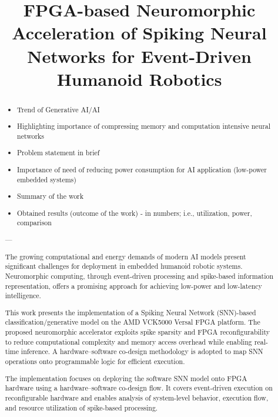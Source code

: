 \documentclass[conference]{IEEEtran}
\begin{document}
\title{%
FPGA-based Neuromorphic Acceleration of Spiking Neural Networks for Event-Driven Humanoid Robotics}
\author{

}

\maketitle

\begin{abstract}

\begin{itemize}
\item Trend of Generative AI/AI
\item Highlighting importance of compressing memory and computation intensive neural networks
\item Problem statement in brief
\item Importance of need of reducing power consumption for AI application (low-power embedded systems)
\item Summary of the work
\item Obtained results (outcome of the work) - in numbers; i.e., utilization, power, comparison
\end{itemize}

---

The growing computational and energy demands of modern AI models present significant challenges for deployment in embedded humanoid robotic systems. Neuromorphic computing, through event-driven processing and spike-based information representation, offers a promising approach for achieving low-power and low-latency intelligence.

This work presents the implementation of a Spiking Neural Network (SNN)-based classification/generative model on the AMD VCK5000 Versal FPGA platform. The proposed neuromorphic accelerator exploits spike sparsity and FPGA reconfigurability to reduce computational complexity and memory access overhead while enabling real-time inference. A hardware–software co-design methodology is adopted to map SNN operations onto programmable logic for efficient execution.

The implementation focuses on deploying the software SNN model onto FPGA hardware using a hardware–software co-design flow. It covers event-driven execution on reconfigurable hardware and enables analysis of system-level behavior, execution flow, and resource utilization of spike-based processing.
\end{abstract}
\end{document}
